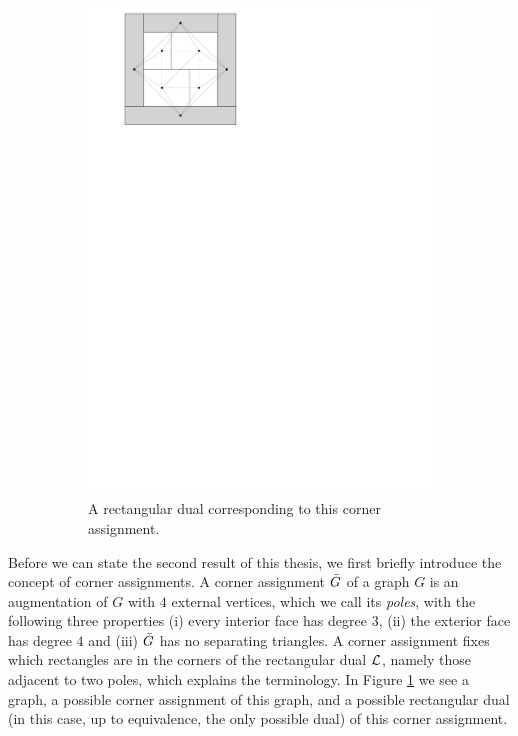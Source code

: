 \begin{figure}
\begin{subfigure}[t]{3cm}
        \includegraphics[scale=.3]{introduction/img/caDual.pdf}
        \caption{A rectangular dual corresponding to this corner assignment.}
      \end{subfigure}
    \caption{}
    \label{fig:intro:cornerAssign}
  \end{figure}

  Before we can state the second result of this thesis, we first briefly introduce the concept of corner assignments.
  A corner assignment $\bar{G}$ of a graph $G$ is an augmentation of $G$ with $4$ external vertices, which we call its \emph{poles}, with the following three properties (i) every interior face has degree $3$, (ii) the exterior face has degree $4$ and (iii) $\bar{G}$ has no separating triangles.
  A corner assignment fixes which rectangles are in the corners of the rectangular dual $\mathcal{L}$, namely those adjacent to two poles, which explains the terminology. In Figure \ref{fig:intro:cornerAssign} we see a graph, a possible corner assignment of this graph, and a possible rectangular dual (in this case, up to equivalence, the only possible dual) of this corner assignment.

